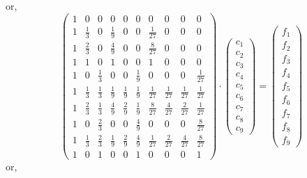 or,
\[
\left(
\begin{array}{cccccccccc}
1 & 0& 0&0&0&0&0&0&0&0 \\
1 & \frac13 & 0 & \frac19 &0 &0 & \frac{1}{27} & 0 & 0 & 0 \\
1 & \frac23 & 0 & \frac49 & 0 & 0 & \frac{8}{27} &0 &0 &0   \\
1 & 1 & 0 & 1 &0 & 0 &1 &0 &0 &0    \\
1 & 0 & \frac13 & 0 & 0 & \frac19 & 0& 0& 0 & \frac{1}{27}\\
1 & \frac13 & \frac13 & \frac19 & \frac19 & \frac19 & \frac{1}{27} & \frac{1}{27} & \frac{1}{27} & \frac{1}{27}    \\
1 & \frac23 & \frac13 & \frac49 & \frac29 & \frac19 
& \frac{8}{27}  & \frac{4}{27}  & \frac{2}{27}  & \frac{1}{27}    \\
1 & 0 & \frac23 & 0 & 0 & \frac49 & 0& 0& 0& \frac{8}{27}  \\
1 & \frac13 & \frac23 & \frac19 & \frac29 & \frac49 & \frac{1}{27} & \frac{2}{27} & \frac{4}{27} & \frac{8}{27}    \\
1 & 0 & 1 & 0 & 0 &1 & 0 & 0 & 0 & 1   
\end{array}
\right)
\cdot
\left(
\begin{array}{c}
c_1 \\ c_2 \\ c_3 \\ c_4 \\ c_5 \\ c_6 \\ c_7 \\ c_8 \\ c_9
\end{array}
\right)
=
\left(
\begin{array}{c}
f_1 \\ f_2 \\ f_3 \\ f_4 \\ f_5 \\ f_6 \\ f_7 \\ f_8 \\ f_9
\end{array}
\right)
\]
or, 
